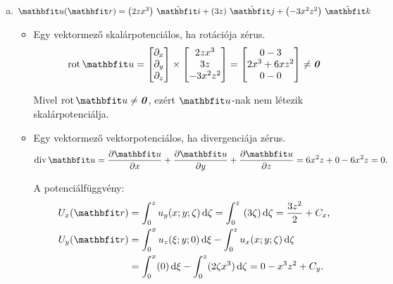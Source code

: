 \documentclass[exercise]{math-standalone}
\begin{document}
\begin{exercise}
{\begin{enumerate}[a)]
      \item $\rvec u(\rvec r) = \ijk{2zx^3}{3z}{-3x^2z^2}$
            \begin{itemize}
              \item Egy vektormező skalárpotenciálos, ha rotációja zérus.
                    \[
                      \rot \rvec u
                      =
                      \begin{bmatrix}
                        \partial_x \\ \partial_y \\ \partial_z
                      \end{bmatrix}
                      \times
                      \begin{bmatrix}
                        2zx^3 \\ 3z \\ -3x^2z^2
                      \end{bmatrix}
                      =
                      \begin{bmatrix}
                        0 - 3           \\
                        2 x^3 + 6 x z^2 \\
                        0 - 0
                      \end{bmatrix}
                      \neq
                      \nvec
                    \]

                    Mivel $\rot \rvec u \neq \nvec$, ezért $\rvec u$-nak nem
                    létezik skalárpotenciálja.

              \item Egy vektormező vektorpotenciálos, ha divergenciája zérus.
                    \[
                      \Div \rvec u
                      =
                      \pdv{\rvec u}{x} + \pdv{\rvec u}{y} + \pdv{\rvec u}{z}
                      =
                      6 x^2 z + 0 -6 x^2 z
                      =
                      0
                      \text.
                    \]

                    A potenciálfüggvény:
                    \begin{align*}
                      U_x(\rvec r)
                       & =
                      \int_0^z u_y(x; y; \zeta) \,\diff \zeta
                      =
                      \int_0^z  (3 \zeta) \,\diff \zeta
                      =
                      \frac{3 z^2}{2} + C_x
                      \text,
                      \\
                      U_y(\rvec r)
                       & =
                      \int_0^x u_z(\xi; y; 0) \,\diff \xi -
                      \int_0^z u_x(x; y; \zeta) \,\diff \zeta
                      \\
                       & =
                      \int_0^x (0) \,\diff \xi -
                      \int_0^z (2 \zeta x^3)  \,\diff \zeta
                      =
                      0 - x^3 z^2 + C_y
                      \text.
                    \end{align*}


\end{itemize}
\end{enumerate}}
\end{exercise}
\end{document}

